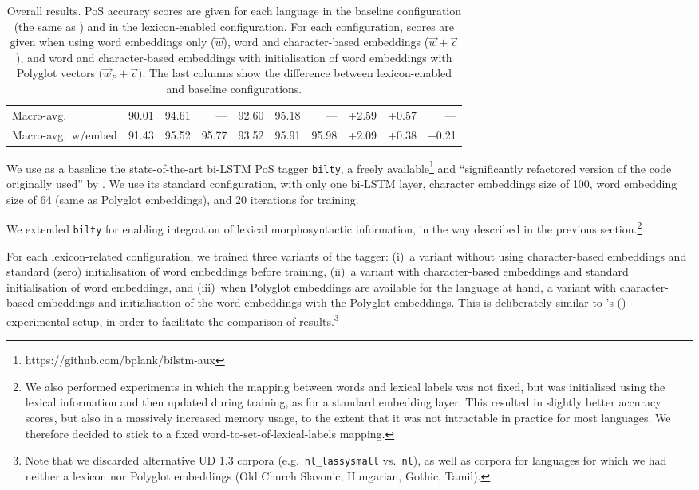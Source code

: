 \documentclass[11pt,letterpaper]{article}
\begin{document}
\begin{table}[t]
\begin{tabular}{l|rrr|rrr|rrr}
\midrule
Macro-avg. & 90.01 & 94.61 & --- & 92.60 & 95.18 & --- & +2.59 & +0.57 & ---\\
Macro-avg.~w/embed & 91.43 & 95.52 & 95.77 & 93.52 & 95.91 & 95.98 & +2.09 & +0.38 & +0.21\\
\end{tabular}
\caption{Overall results. PoS accuracy scores are given for each language in the baseline
  configuration (the same as \citealp{plank16}) and in the lexicon-enabled configuration. For each configuration, scores
are given when using word embeddings only ($\vec{w}$), word and character-based embeddings ($\vec{w}+\vec{c}$), and word
and character-based embeddings with initialisation of word embeddings with Polyglot vectors ($\vec{w}_P+\vec{c}$). The
 last columns show the difference between lexicon-enabled and baseline configurations.{}}\label{tbl:results}
\end{table}

We use as a baseline the state-of-the-art bi-LSTM PoS tagger \texttt{bilty}, a freely
available\footnote{https://github.com/bplank/bilstm-aux} and ``significantly refactored version of the code
originally used'' by \citet{plank16}. We use its standard configuration, with only one bi-LSTM layer, character
embeddings size of 100, word embedding size of 64 (same as Polyglot embeddings), and 20 iterations for training.

We extended \texttt{bilty} for enabling integration of lexical morphosyntactic information, in the way described in the
previous section.\footnote{We also performed experiments in which the mapping between words and lexical labels was not
  fixed, but was initialised using the lexical information and then updated during training, as for a standard embedding
  layer. This resulted in slightly better accuracy scores, but also in a massively increased memory usage, to the extent
  that it was not intractable in practice for most languages. We therefore decided to stick to a fixed
  word-to-set-of-lexical-labels mapping.}

For each lexicon-related configuration, we trained three variants of the tagger: (i)~a variant without using
character-based embeddings and standard (zero) initialisation of word embeddings before training, (ii)~a variant with
character-based embeddings and standard initialisation of word embeddings, and (iii)~when Polyglot embeddings are
available for the language at hand, a variant with character-based embeddings and initialisation of the word embeddings
with the Polyglot embeddings. This is deliberately similar to \citeauthor{plank16}'s (\citeyear{plank16}) experimental
setup, in order to facilitate the comparison of results.\footnote{Note that we discarded alternative UD 1.3 corpora
  (e.g.~{\tt nl\_lassysmall} vs.~{\tt nl}), as well as corpora for languages for which we had neither a
  lexicon nor Polyglot embeddings (Old Church Slavonic, Hungarian, Gothic, Tamil).}
\end{document}
